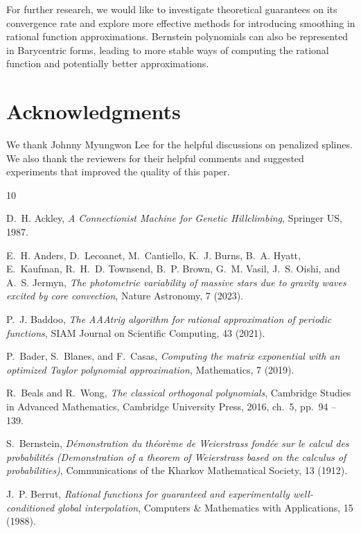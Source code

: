 \documentclass{article}
\begin{document}
For further research, we would like to investigate theoretical guarantees on its convergence rate and explore more effective methods for introducing smoothing in rational function approximations. Bernstein polynomials can also be represented in Barycentric forms, leading to more stable ways of computing the rational function and potentially better approximations.

\section*{Acknowledgments}
We thank Johnny Myungwon Lee for the helpful discussions on penalized splines. We also thank the reviewers for their helpful comments and suggested experiments that improved the quality of this paper. 


\begin{thebibliography}{10}

{\sc D.~H. Ackley}, {\em A Connectionist Machine for Genetic Hillclimbing}, Springer US, 1987.

{\sc E.~H. Anders, D.~Lecoanet, M.~Cantiello, K.~J. Burns, B.~A. Hyatt, E.~Kaufman, R.~H.~D. Townsend, B.~P. Brown, G.~M. Vasil, J.~S. Oishi, and A.~S. Jermyn}, {\em The photometric variability of massive stars due to gravity waves excited by core convection}, Nature Astronomy, 7 (2023).

{\sc P.~J. Baddoo}, {\em The {AAA}trig algorithm for rational approximation of periodic functions}, SIAM Journal on Scientific Computing, 43 (2021).

{\sc P.~Bader, S.~Blanes, and F.~Casas}, {\em Computing the matrix exponential with an optimized {T}aylor polynomial approximation}, Mathematics, 7 (2019).

{\sc R.~Beals and R.~Wong}, {\em The classical orthogonal polynomials}, Cambridge Studies in Advanced Mathematics, Cambridge University Press, 2016, ch.~5, pp.~94 -- 139.

{\sc S.~Bernstein}, {\em D\'emonstration du th\'eor\`eme de {W}eierstrass fond\'ee sur le calcul des probabilit\'es ({D}emonstration of a theorem of {W}eierstrass based on the calculus of probabilities)}, Communications of the Kharkov Mathematical Society, 13 (1912).

{\sc J.~P. Berrut}, {\em Rational functions for guaranteed and experimentally well-conditioned global interpolation}, Computers \& Mathematics with Applications, 15 (1988).


\end{thebibliography}
\end{document}
